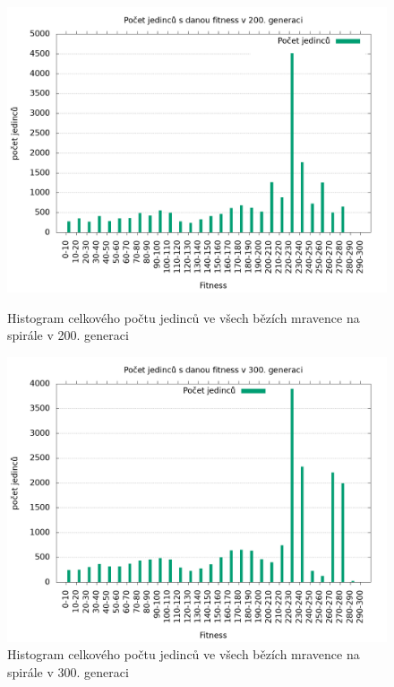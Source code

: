 \begin{figure}[h]
    \begin{minipage}[c]{0.48\linewidth}
        \includegraphics[width=\linewidth]{obrazky/mravenec_spirala_fitnessHistogram200.png}
        \caption{Histogram celkového počtu jedinců ve všech bězích mravence na spirále v 200. generaci}
        \label{fig:mravenec_spirala_histogram_200}
    \end{minipage}
    \hfill
    \begin{minipage}[c]{0.48\linewidth}
        \includegraphics[width=\linewidth]{obrazky/mravenec_spirala_fitnessHistogram300.png}
        \caption{Histogram celkového počtu jedinců ve všech bězích mravence na spirále v 300. generaci}
        \label{fig:mravenec_spirala_histogram_300}
    \end{minipage}
\end{figure}

